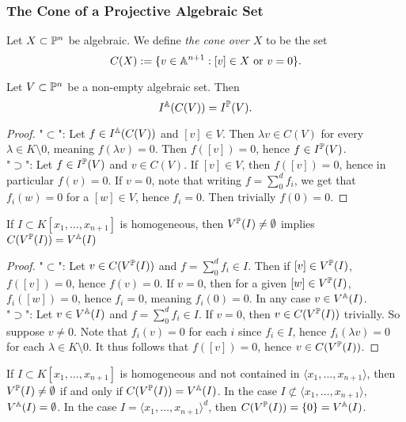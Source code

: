 \subsubsection{The Cone of a Projective Algebraic Set}
    \begin{definition}
        Let $X\subset \mathbb{P}^n$ be algebraic. We define \textit{the cone over $X$} to be the set 
        $$C(X):=\{v\in \mathbb{A}^{n+1}: [v]\in X \text{ or } v=0\}.$$
    \end{definition}
    \begin{lemma}\label{ProjectiveAndAffineIdealsOfNonEmptyProjectiveSetsRespectivelyItsConeAgree}
        Let $V\subset \mathbb{P}^n$ be a non-empty algebraic set. Then 
        $$I^{\mathbb{A}}(C(V))=I^{\mathbb{P}}(V).$$
    \end{lemma}
    \begin{proof}
        "$\subset$": Let $f\in I^{\mathbb{A}}(C(V))$ and $[v]\in V$. Then $\lambda v\in C(V)$ for every $\lambda\in K\setminus 0$, meaning $f(\lambda v)=0$. Then $f([v])=0$, hence $f\in I^{\mathbb{P}}(V)$.\\
        "$\supset$": Let $f\in I^{\mathbb{P}}(V)$ and $v\in C(V)$. If $[v]\in V$, then $f([v])=0$, hence in particular $f(v)=0$. If $v=0$, note that writing $f=\sum_0^d f_i$, we get that $f_i(w)=0$ for a $[w]\in V$, hence $f_i = 0$. Then trivially $f(0)=0$.
    \end{proof}
    \begin{lemma}\label{EqualityOfConeAndAffineVanishingSet}
        If $I\subset K[x_1,\dots,x_{n+1}]$ is homogeneous, then $V^{\mathbb{P}}(I)\neq  \emptyset$ implies $C(V^{\mathbb{P}}(I))=V^{\mathbb{A}}(I)$
    \end{lemma}
    \begin{proof}
         "$\subset$": Let $v\in C(V^{\mathbb{P}}(I))$ and $f=\sum_0^d f_i\in I$. Then if $[v]\in V^{\mathbb{P}}(I)$, $f([v])=0$, hence $f(v)=0$. If $v=0$, then for a given $[w]\in V^{\mathbb{P}}(I)$, $f_i([w])=0$, hence $f_i=0$, meaning $f_i(0)=0$. In any case $v\in V^{\mathbb{A}}(I)$.\\
        "$\supset$": Let $v\in V^{\mathbb{A}}(I)$ and $f=\sum_0^d f_i\in I$. If $v=0$, then $v\in C(V^{\mathbb{P}}(I))$ trivially. So suppose $v\neq 0$. Note that $f_i(v)=0$ for each $i$ since $f_i\in I$, hence $f_i(\lambda v)=0$ for each $\lambda\in K\setminus 0$. It thus follows that $f([v])=0$, hence $v\in C(V^{\mathbb{P}}(I))$.
    \end{proof}
    \begin{lemma}
        If $I\subset K[x_1,\dots,x_{n+1}]$ is homogeneous and not contained in $\langle x_1,\dots,x_{n+1}\rangle$, then $V^{\mathbb{P}}(I)\neq \emptyset$ if and only if $C(V^{\mathbb{P}}(I))=V^{\mathbb{A}}(I)$. In the case $I\not\subset \langle x_1,\dots,x_{n+1}\rangle$, $V^{\mathbb{A}}(I)= \emptyset$. In the case $I=\langle x_1,\dots,x_{n+1}\rangle^d$, then $C(V^{\mathbb{P}}(I))=\{0\}=V^{\mathbb{A}}(I)$.
    \end{lemma}

